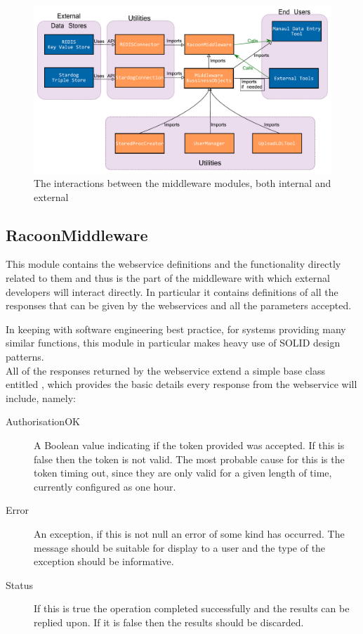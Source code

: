 \begin{figure}
\myfloatalign
\includegraphics[max height=0.9\textwidth]{gfx/MiddlewareHighLevel}
\caption{The interactions between the middleware modules, both internal and external}
\label{fig:MiddlewareHL}
\end{figure}

\subsection{RacoonMiddleware}
\label{sec:middlewaremodule}
This module contains the webservice definitions and the functionality directly related to them and thus is the part of the middleware with which external developers will interact directly. In particular it contains definitions of all the responses that can be given by the webservices and all the parameters accepted.

In keeping with software engineering best practice, for systems providing many similar functions, this module in particular makes heavy use of SOLID design patterns. \\ All of the responses returned by the webservice extend a simple base class entitled , which provides the basic details every response from the webservice will include, namely:
\begin{description}
    \item[AuthorisationOK] A Boolean value indicating if the token provided was accepted. If this is false then the token is not valid. The most probable cause for this is the token timing out, since they are only valid for a given length of time, currently configured as one hour.
    \item[Error] An exception, if this is not null an error of some kind has occurred. The message should be suitable for display to a user and the type of the exception should be informative.
    \item[Status] If this is true the operation completed successfully and the results can be replied upon. If it is false then the results should be discarded. 
\end{description}

